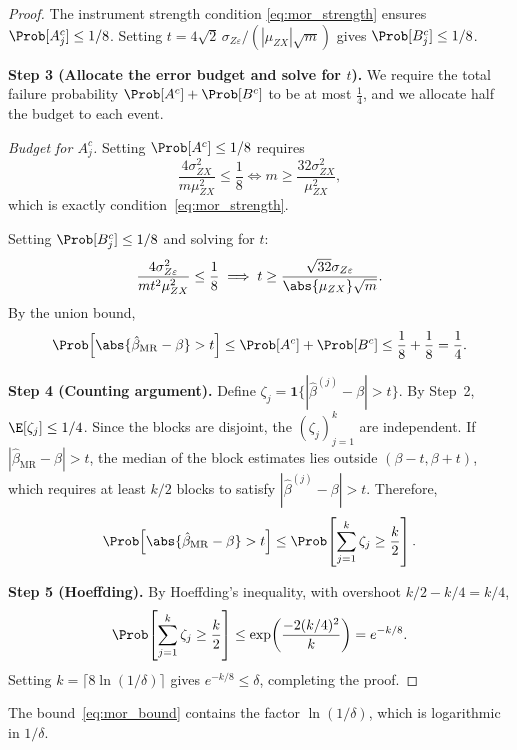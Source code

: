 \begin{proof}
    The instrument strength condition \eqref{eq:mor_strength} ensures $\Prob[A_j^c] \leq 1/8$. Setting $t = 4\sqrt{2}\,\sigma_{Z\varepsilon}/(|\mu_{ZX}|\sqrt{m})$ gives $\Prob[B_j^c] \leq 1/8$.


    \medskip\noindent\textbf{Step 3 (Allocate the error budget and solve for $t$).}
    We require the total failure probability $\Prob[A^c]+\Prob[B^c]$ to be at most $\frac{1}{4}$, and we allocate half the budget to each event.

    \emph{Budget for $A_j^c$.}
    Setting $\Prob[A^c]\leq 1/8$ requires
    \[
        \frac{4\sigma_{ZX}^2}{m\mu_{ZX}^2} \leq \frac{1}{8}
        \iff
        m \geq \frac{32\sigma_{ZX}^2}{\mu_{ZX}^2},
    \]
    which is exactly condition~\eqref{eq:mor_strength}.

    Setting $\Prob[B_j^c]\leq 1/8$ and solving for $t$:
    \[
        \frac{4\sigma_{Z\varepsilon}^2}{mt^2\mu_{ZX}^2} \leq \frac{1}{8} \implies t \geq \frac{\sqrt{32}\sigma_{Z\varepsilon}}{\abs{\mu_{ZX}}\sqrt{m}}.
    \]
    By the union bound,
    \[
        \Prob\!\left[\abs{\hat{\beta}_{\mathrm{MR}}-\beta} > t\right] \leq \Prob[A^c] + \Prob[B^c] \leq \frac{1}{8} + \frac{1}{8} = \frac{1}{4}.
    \]

\medskip\noindent\textbf{Step 4 (Counting argument).} Define $\zeta_j = \mathbf{1}\{|\hat{\beta}^{(j)} - \beta| > t\}$. By Step~2, $\E[\zeta_j] \leq 1/4$. Since the blocks are disjoint, the $(\zeta_j)_{j=1}^{k}$ are independent. If $|\hat{\beta}_{\mathrm{MR}} - \beta| > t$, the median of the block estimates lies outside $(\beta - t, \beta + t)$, which requires at least $k/2$ blocks to satisfy $|\hat{\beta}^{(j)} - \beta| > t$. Therefore,
\[
    \Prob\!\left[\abs{\hat{\beta}_{\mathrm{MR}} - \beta} > t\right] \leq \Prob\!\left[\sum_{j=1}^{k}\zeta_j \geq \frac{k}{2}\right].
\]

\medskip\noindent\textbf{Step 5 (Hoeffding).} By Hoeffding's inequality, with overshoot $k/2 - k/4 = k/4$,
\[
    \Prob\!\left[\sum_{j=1}^{k}\zeta_j \geq \frac{k}{2}\right] \leq \exp\!\left(\frac{-2(k/4)^2}{k}\right) = e^{-k/8}.
\]
Setting $k = \lceil 8\ln(1/\delta)\rceil$ gives $e^{-k/8} \leq \delta$, completing the proof.
\end{proof}

\begin{remark}
\label{rem:iv_polynomial}
    The bound~\eqref{eq:mor_bound} contains the factor $\ln{(1/\delta)}$, which is logarithmic in $1/\delta$.
\end{remark}

